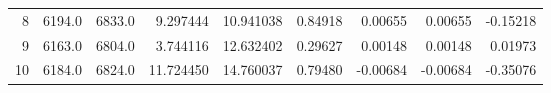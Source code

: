 \begin{longtable}{rrrrrrrrr}
           8 &          6194.0 &          6833.0 &            9.297444 &             10.941038 &                    0.84918 &                                         0.00655 &                                        0.00655 &                                          -0.15218 \\
           9 &          6163.0 &          6804.0 &            3.744116 &             12.632402 &                    0.29627 &                                         0.00148 &                                        0.00148 &                                           0.01973 \\
          10 &          6184.0 &          6824.0 &           11.724450 &             14.760037 &                    0.79480 &                                        -0.00684 &                                       -0.00684 &                                          -0.35076 \\
\end{longtable}
